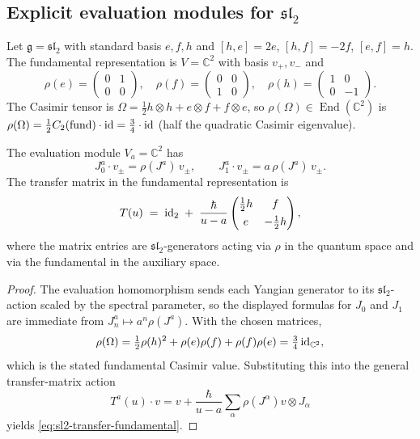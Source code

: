 \subsection{Explicit evaluation modules for $\mathfrak{sl}_2$}

\begin{computation}
\label{comp:sl2-eval}
Let $\mathfrak{g}=\mathfrak{sl}_2$ with standard basis
$e,f,h$ and $[h,e]=2e$, $[h,f]=-2f$, $[e,f]=h$.
The fundamental representation is $V=\mathbb{C}^2$ with
basis $v_+,v_-$ and
\[
\rho(e)=\begin{pmatrix}0&1\\0&0\end{pmatrix},
\quad
\rho(f)=\begin{pmatrix}0&0\\1&0\end{pmatrix},
\quad
\rho(h)=\begin{pmatrix}1&0\\0&-1\end{pmatrix}.
\]
The Casimir tensor is
$\Omega=\tfrac{1}{2}h\otimes h+e\otimes f+f\otimes e$,
so $\rho(\Omega)\in\operatorname{End}(\mathbb{C}^2)$
is $\rho(\Omega)=\tfrac{1}{2}C_2(\mathrm{fund})\cdot\mathrm{id}
=\tfrac{3}{4}\cdot\mathrm{id}$ (half the quadratic Casimir eigenvalue).

The evaluation module $V_a=\mathbb{C}^2$ has
\[
J^a_0\cdot v_\pm=\rho(J^a)\,v_\pm,
\qquad
J^a_1\cdot v_\pm=a\,\rho(J^a)\,v_\pm.
\]
The transfer matrix in the fundamental representation is
\begin{equation}\label{eq:sl2-transfer-fundamental}
T(u)
\;=\;
\mathrm{id}_2
\;+\;
\frac{\hbar}{u-a}
\begin{pmatrix}
\tfrac{1}{2}h & f \\[4pt]
e & -\tfrac{1}{2}h
\end{pmatrix},
\end{equation}
where the matrix entries are $\mathfrak{sl}_2$-generators
acting via $\rho$ in the quantum space and via the
fundamental in the auxiliary space.
\end{computation}

\begin{proof}
The evaluation homomorphism sends each Yangian generator to its
$\mathfrak{sl}_2$-action scaled by the spectral parameter, so the
displayed formulas for $J_0$ and $J_1$ are immediate from
$J_n^a\mapsto a^n\rho(J^a)$.
With the chosen matrices,
\[
\rho(\Omega)
=\tfrac12\rho(h)^2+\rho(e)\rho(f)+\rho(f)\rho(e)
=\tfrac34\,\mathrm{id}_{\mathbb C^2},
\]
which is the stated fundamental Casimir value.
Substituting this into the general transfer-matrix action
\[
T^a(u)\cdot v
=
v+\frac{\hbar}{u-a}\sum_\alpha \rho(J^\alpha)v\otimes J_\alpha
\]
yields
\eqref{eq:sl2-transfer-fundamental}.
\end{proof}

